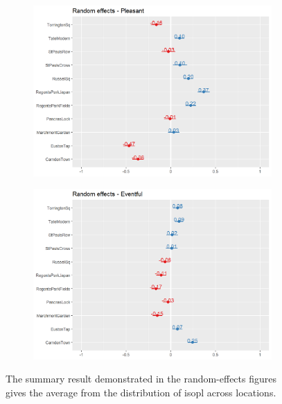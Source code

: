 \begin{figure}[!h]
  \centering

  \begin{subfigure}{.75\textwidth}
    \centering
    \includegraphics[width=\textwidth]{Figures/whoRandPlNew.png}
  \end{subfigure}%
  \hfill
  \begin{subfigure}{.75\textwidth}
    \centering
    \includegraphics[width=\textwidth]{Figures/whoRandEvNew.png}
  \end{subfigure}
  \hfill
  \caption{The summary result demonstrated in the random-effects figures gives the average from the distribution of \gls{isopl} across locations.\label{fig:whoRand}}

\end{figure}


